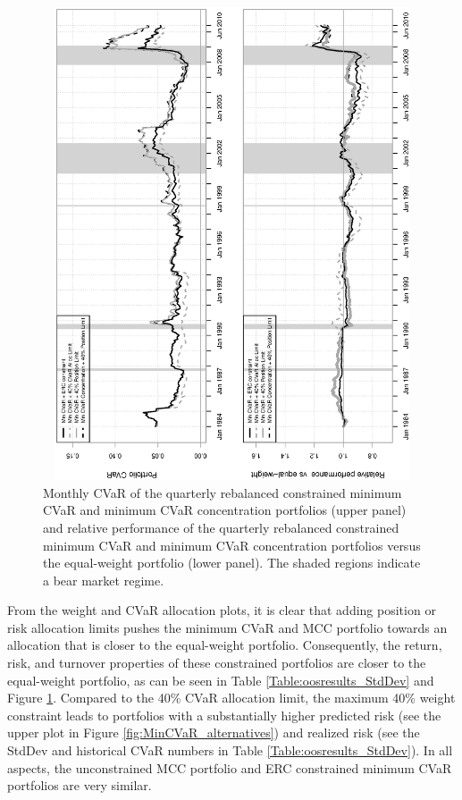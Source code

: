 \documentclass[12pt,a4paper]{article}
\begin{document}
\begin{figure}[t]
\begin{center}
\vspace{-1cm}
\caption{Monthly CVaR of the quarterly rebalanced constrained minimum CVaR and minimum CVaR concentration portfolios (upper panel) and relative performance of the quarterly rebalanced constrained minimum CVaR and minimum CVaR concentration portfolios versus the equal-weight portfolio (lower panel). The shaded regions indicate a bear market regime. \label{fig:relperformance_alternatives}  }
\includegraphics[width=12cm,height=14cm,angle=270]{portfolioCVaRRelPerf_CC_alternatives.eps}
\end{center}
\end{figure}

From the weight and CVaR allocation plots, it is clear that adding position or risk allocation limits pushes the minimum CVaR and MCC portfolio towards an allocation that is closer to the equal-weight portfolio. Consequently, the return, risk, and turnover properties of these constrained portfolios are closer to the equal-weight portfolio, as can be seen in Table \ref{Table:oosresults_StdDev} and Figure \ref{fig:relperformance_alternatives}. Compared to the 40\% CVaR allocation limit, the maximum 40\% weight constraint leads to portfolios with a substantially higher predicted risk (see the upper plot in Figure \ref{fig:MinCVaR_alternatives}) and realized risk (see the StdDev and historical CVaR numbers in Table \ref{Table:oosresults_StdDev}). In all aspects, the unconstrained MCC portfolio and ERC constrained minimum CVaR portfolios are very similar.
\end{document}
